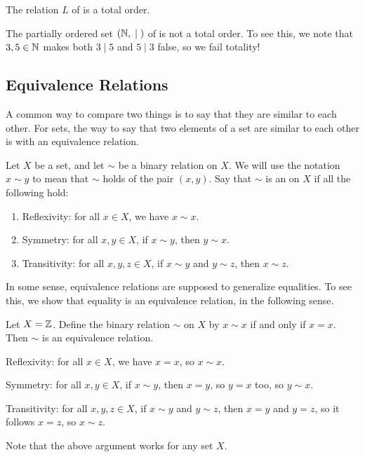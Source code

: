 \documentclass[../notes.tex]{subfiles}
\begin{document}
\begin{example}
    The relation $L$ of  is a total order.
\end{example}
\begin{nex}
    The partially ordered set $(\mathbb N,{}\mid{})$ of  is not a total order. To see this, we note that $3,5\in\mathbb N$ makes both $3\mid 5$ and $5\mid 3$ false, so we fail totality!
\end{nex}

\subsection{Equivalence Relations}
A common way to compare two things is to say that they are similar to each other. For sets, the way to say that two elements of a set are similar to each other is with an equivalence relation.
\begin{definition}
    Let $X$ be a set, and let $\sim$ be a binary relation on $X$. We will use the notation $x \sim y$ to mean that $\sim$ holds of the pair $(x, y)$. Say that $\sim$ is an  on $X$ if all the following hold:
    \begin{enumerate}[label=(\alph*)]
        \item Reflexivity: for all $x \in X$, we have $x \sim x$.
        \item Symmetry: for all $x, y \in X$, if $x \sim y$, then $y \sim x$.
        \item Transitivity: for all $x, y, z \in X$, if $x \sim y$ and $y \sim z$, then $x \sim z$.
    \end{enumerate}
\end{definition}
In some sense, equivalence relations are supposed to generalize equalities. To see this, we show that equality is an equivalence relation, in the following sense.
\begin{example} \label{ex:eq-is-equiv}
    Let $X=\mathbb Z$. Define the binary relation $\sim$ on $X$ by $x\sim x$ if and only if $x=x$. Then $\sim$ is an equivalence relation.
    \begin{listalph}
        \item Reflexivity: for all $x\in X$, we have $x=x$, so $x\sim x$.
        \item Symmetry: for all $x,y\in X$, if $x\sim y$, then $x=y$, so $y=x$ too, so $y\sim x$.
        \item Transitivity: for all $x,y,z\in X$, if $x\sim y$ and $y\sim z$, then $x=y$ and $y=z$, so it follows $x=z$, so $x\sim z$.
    \end{listalph}
    Note that the above argument works for any set $X$.
\end{example}
\end{document}
